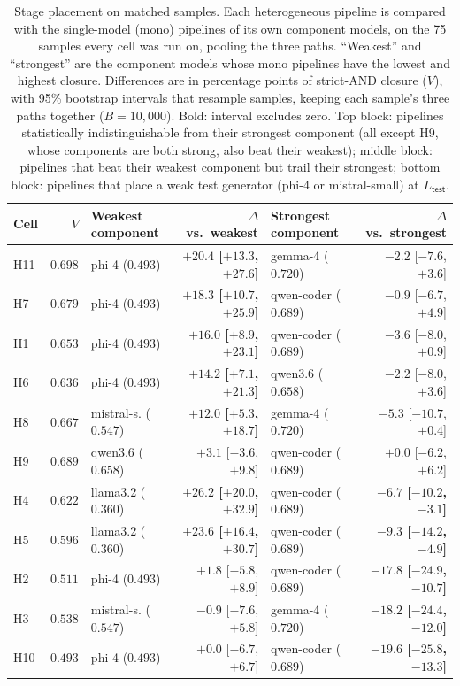 \begin{table}[!htbp]
\centering
\footnotesize
\caption{Stage placement on matched samples. Each heterogeneous pipeline is compared with the single-model (mono) pipelines of its own component models, on the 75 samples every cell was run on, pooling the three paths. ``Weakest'' and ``strongest'' are the component models whose mono pipelines have the lowest and highest closure. Differences are in percentage points of strict-AND closure ($V$), with 95\% bootstrap intervals that resample samples, keeping each sample's three paths together ($B = 10{,}000$). Bold: interval excludes zero. Top block: pipelines statistically indistinguishable from their strongest component (all except H9, whose components are both strong, also beat their weakest); middle block: pipelines that beat their weakest component but trail their strongest; bottom block: pipelines that place a weak test generator (phi-4 or mistral-small) at $L_{\textsf{test}}$.}
\label{tab:stage_placement}
\begin{tabular}{@{}lrlrlr@{}}
\toprule
Cell & $V$ & Weakest component & $\Delta$ vs.\ weakest & Strongest component & $\Delta$ vs.\ strongest \\
\midrule
H11 & $0.698$ & phi-4 ($0.493$) & \textbf{$+20.4$ [$+13.3$, $+27.6$]} & gemma-4 ($0.720$) & $-2.2$ [$-7.6$, $+3.6$] \\
H7 & $0.679$ & phi-4 ($0.493$) & \textbf{$+18.3$ [$+10.7$, $+25.9$]} & qwen-coder ($0.689$) & $-0.9$ [$-6.7$, $+4.9$] \\
H1 & $0.653$ & phi-4 ($0.493$) & \textbf{$+16.0$ [$+8.9$, $+23.1$]} & qwen-coder ($0.689$) & $-3.6$ [$-8.0$, $+0.9$] \\
H6 & $0.636$ & phi-4 ($0.493$) & \textbf{$+14.2$ [$+7.1$, $+21.3$]} & qwen3.6 ($0.658$) & $-2.2$ [$-8.0$, $+3.6$] \\
H8 & $0.667$ & mistral-s. ($0.547$) & \textbf{$+12.0$ [$+5.3$, $+18.7$]} & gemma-4 ($0.720$) & $-5.3$ [$-10.7$, $+0.4$] \\
H9 & $0.689$ & qwen3.6 ($0.658$) & $+3.1$ [$-3.6$, $+9.8$] & qwen-coder ($0.689$) & $+0.0$ [$-6.2$, $+6.2$] \\
\midrule
H4 & $0.622$ & llama3.2 ($0.360$) & \textbf{$+26.2$ [$+20.0$, $+32.9$]} & qwen-coder ($0.689$) & \textbf{$-6.7$ [$-10.2$, $-3.1$]} \\
H5 & $0.596$ & llama3.2 ($0.360$) & \textbf{$+23.6$ [$+16.4$, $+30.7$]} & qwen-coder ($0.689$) & \textbf{$-9.3$ [$-14.2$, $-4.9$]} \\
\midrule
H2 & $0.511$ & phi-4 ($0.493$) & $+1.8$ [$-5.8$, $+8.9$] & qwen-coder ($0.689$) & \textbf{$-17.8$ [$-24.9$, $-10.7$]} \\
H3 & $0.538$ & mistral-s. ($0.547$) & $-0.9$ [$-7.6$, $+5.8$] & gemma-4 ($0.720$) & \textbf{$-18.2$ [$-24.4$, $-12.0$]} \\
H10 & $0.493$ & phi-4 ($0.493$) & $+0.0$ [$-6.7$, $+6.7$] & qwen-coder ($0.689$) & \textbf{$-19.6$ [$-25.8$, $-13.3$]} \\
\bottomrule
\end{tabular}
\end{table}
